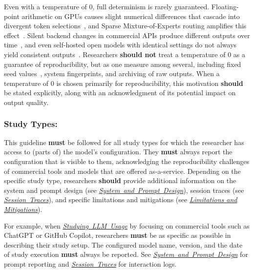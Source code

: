 \documentclass[smallextended]{svjour3}
\newcommand{\must}{\textbf{must}\xspace}
\newcommand{\should}{\textbf{should}\xspace}
\newcommand{\shouldnot}{\textbf{should not}\xspace}
\newcommand{\llmusage}{\hyperref[sec:studying-llm-usage-in-software-engineering]{\mbox{\emph{Studying LLM Usage}}}\xspace}
\newcommand{\llmusage}{\href{/study-types/usage/}{\emph{Studying LLM Usage}}\xspace}
\newcommand{\design}{\hyperref[sec:report-system-and-prompt-design]{\mbox{\emph{System and Prompt Design}}}\xspace}
\newcommand{\traces}{\hyperref[sec:report-session-traces]{\mbox{\emph{Session Traces}}}\xspace}
\newcommand{\limitationsmitigations}{\hyperref[sec:report-limitations-and-mitigations]{\emph{Limitations and Mitigations}}\xspace}
\newcommand{\design}{\href{/guidelines/design/}{\emph{System and Prompt Design}}\xspace}
\newcommand{\traces}{\href{/guidelines/traces/}{\emph{Session Traces}}\xspace}
\newcommand{\limitationsmitigations}{\href{/guidelines/limitations/}{\emph{Limitations and Mitigations}}\xspace}
\newcommand{\guidelinesubsubsection}[1]{\subsubsection{\bfseries #1:}}
\newcommand{\guidelinesubsubsection}[1]{\subsubsection{#1}}
\begin{document}
Even with a temperature of 0, full determinism is rarely guaranteed. Floating-point arithmetic on GPUs causes slight numerical differences that cascade into divergent token selections~\cite{YuanNondeterminismLLMInference}, and Sparse Mixture-of-Experts routing amplifies this effect~\cite{Chann2023}. Silent backend changes in commercial APIs produce different outputs over time~\cite{DBLP:journals/corr/abs-2307-09009}, and even self-hosted open models with identical settings do not always yield consistent outputs~\cite{DBLP:journals/corr/abs-2408-04667}.
Researchers \shouldnot treat a temperature of 0 as a guarantee of reproducibility, but as one measure among several, including fixed seed values~\cite{OpenAI23}, system fingerprints, and archiving of raw outputs.
When a temperature of 0 is chosen primarily for reproducibility, this motivation \should be stated explicitly, along with an acknowledgment of its potential impact on output quality.

\guidelinesubsubsection{Study Types}

This guideline \must be followed for all study types for which the researcher has access to (parts of) the model's configuration.
They \must always report the configuration that is visible to them, acknowledging the reproducibility challenges of commercial tools and models that are offered as-a-service.
Depending on the specific study type, researchers \should provide additional information on the system and prompt design (see \design), session traces (see \traces), and specific limitations and mitigations (see \limitationsmitigations).

For example, when \llmusage by focusing on commercial tools such as ChatGPT or GitHub Copilot, researchers \must be as specific as possible in describing their study setup.
The configured model name, version, and the date of study execution \must always be reported.
See \design for prompt reporting and \traces for interaction logs.
\end{document}
